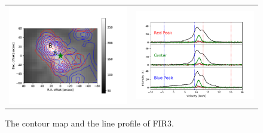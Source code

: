 \begin{figure}[h!]
	\begin{center}
		\begin{tabular}{cc}
			\includegraphics[width=7cm]{Orion_12CO2-1_FIR3_rbcontour_400_modified} &   \includegraphics[width=7cm]{Orion_12CO2-1_FIR3_line_profile_400}
		\end{tabular}
		\caption{The contour map and the line profile of FIR3.}
	\label{fig:FIR321}
	\end{center}
\end{figure}

